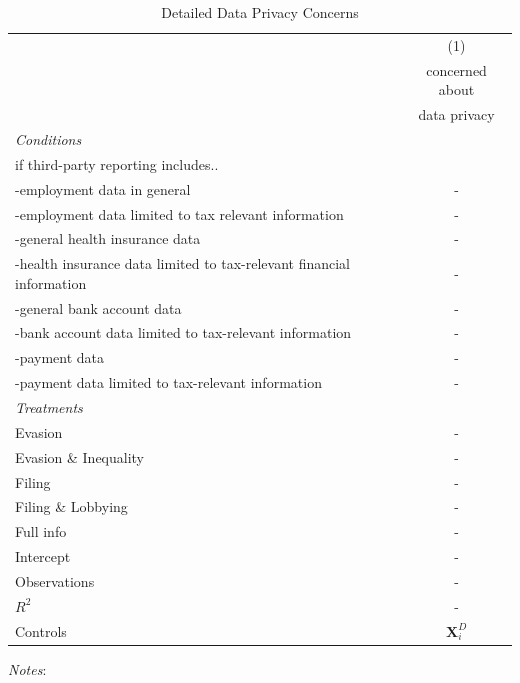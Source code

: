 \documentclass[11pt]{article}
\begin{document}
\begin{table}[!htbp]\centering
\caption{Detailed Data Privacy Concerns}
\label{tab:detaileddataprivacy}
\begin{threeparttable}
\begin{tabular}{l|c}
\toprule
& (1) \\
 & concerned about \\
 & data privacy \\
 \midrule
\textit{Conditions} \\[0.25em]
if third-party reporting includes.. & \\[0.25em]
-employment data in general & - \\[0.25em]
-employment data limited to tax relevant information & - \\[0.25em]
-general health insurance data & - \\[0.25em]
-health insurance data limited to tax-relevant financial information & -\\[0.25em]
-general bank account data & - \\[0.25em]
-bank account data limited to tax-relevant information & - \\[0.25em]
-payment data & - \\[0.25em]
-payment data limited to tax-relevant information & - \\[1em]
\textit{Treatments} \\[0.25em]
Evasion         & - \\[0.25em]
Evasion \& Inequality     & - \\[0.25em]
Filing            & - \\[0.25em]
Filing \& Lobbying           & - \\[0.25em]
Full info               & - \\[1em]
Intercept &-  \\
\midrule
Observations                        &-       \\
$R^2$                               &-    \\
Controls                 & $\mathbf{X}_{i}^{D}$      \\
\bottomrule
\end{tabular}
\begin{tablenotes}[flushleft]
\footnotesize
\item \textit{Notes}:   
\end{tablenotes}
\end{threeparttable}
\end{table} 
\FloatBarrier
\end{document}

